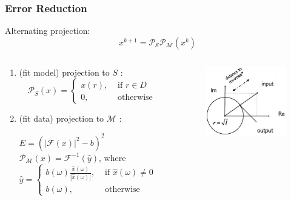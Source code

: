 \documentclass[UTF8]{beamer}
\begin{document}
\begin{frame}[c]\frametitle{Error Reduction}


Alternating projection:
$$
x^{k+1}=\mathcal{P}_{\mathcal{S}} \mathcal{P}_{\mathcal{M}}\left(x^{k}\right)
$$
\begin{columns}

\begin{column}{0.5\textwidth}
\begin{enumerate}
\item(fit model) projection to $S$ :
$$
\mathcal{P}_{S}(x)=\left\{\begin{array}{cc}
x(r), & \text { if } r \in D \\
0, & \text { otherwise }
\end{array}\right.
$$
\item(fit data) projection to $\mathcal{M}$ :

$E = (|\mathcal{F}(x)|^2 - b)^2$
$\mathcal{P}_{\mathcal{M}}(x)=\mathcal{F}^{-1}(\hat{y})$, where $\hat{y}=\left\{\begin{array}{cc}b(\omega) \frac{\hat{x}(\omega)}{|\hat{x}(\omega)|}, & \text { if } \hat{x}(\omega) \neq 0 \\ b(\omega), & \text { otherwise }\end{array}\right.$

\end{enumerate}
\end{column}

\begin{column}{0.5\textwidth}
\begin{figure}
\includegraphics[width=1\linewidth]{../figures0/errorreduction.jpg}  
  \end{figure}
\end{column}

\end{columns}

\end{frame}
\end{document}
